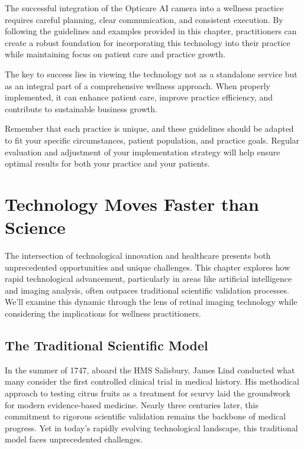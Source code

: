 \documentclass[
  Letterpaper,
]{scrbook}
\begin{document}
The successful integration of the Opticare AI camera into a wellness
practice requires careful planning, clear communication, and consistent
execution. By following the guidelines and examples provided in this
chapter, practitioners can create a robust foundation for incorporating
this technology into their practice while maintaining focus on patient
care and practice growth.

The key to success lies in viewing the technology not as a standalone
service but as an integral part of a comprehensive wellness approach.
When properly implemented, it can enhance patient care, improve practice
efficiency, and contribute to sustainable business growth.

Remember that each practice is unique, and these guidelines should be
adapted to fit your specific circumstances, patient population, and
practice goals. Regular evaluation and adjustment of your implementation
strategy will help ensure optimal results for both your practice and
your patients.


\chapter{Technology Moves Faster than
Science}\label{technology-moves-faster-than-science}

The intersection of technological innovation and healthcare presents
both unprecedented opportunities and unique challenges. This chapter
explores how rapid technological advancement, particularly in areas like
artificial intelligence and imaging analysis, often outpaces traditional
scientific validation processes. We'll examine this dynamic through the
lens of retinal imaging technology while considering the implications
for wellness practitioners.

\section{The Traditional Scientific
Model}\label{the-traditional-scientific-model}

In the summer of 1747, aboard the HMS Salisbury, James Lind conducted
what many consider the first controlled clinical trial in medical
history. His methodical approach to testing citrus fruits as a treatment
for scurvy laid the groundwork for modern evidence-based medicine.
Nearly three centuries later, this commitment to rigorous scientific
validation remains the backbone of medical progress. Yet in today's
rapidly evolving technological landscape, this traditional model faces
unprecedented challenges.
\end{document}
